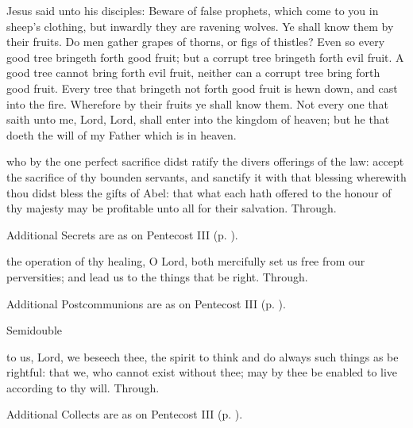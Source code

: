  Jesus said unto his disciples: Beware of false prophets, which come to you in sheep's clothing, but inwardly they are ravening wolves. Ye shall know them by their fruits. Do men gather grapes of thorns, or figs of thistles? Even so every good tree bringeth forth good fruit; but a corrupt tree bringeth forth evil fruit. A good tree cannot bring forth evil fruit, neither can a corrupt tree bring forth good fruit. Every tree that bringeth not forth good fruit is hewn down, and cast into the fire. Wherefore by their fruits ye shall know them. Not every one that saith unto me, Lord, Lord, shall enter into the kingdom of heaven; but he that doeth the will of my Father which is in heaven.

\secret
{} who by the one perfect sacrifice didst ratify the divers offerings of the law: accept the sacrifice of thy bounden servants, and sanctify it with that blessing wherewith thou didst bless the gifts of Abel: that what each hath offered to the honour of thy majesty may be profitable unto all for their salvation. Through.
\begin{rubric}
    Additional Secrets are as on Pentecost III (p. \pageref{PentecostIII}).
\end{rubric}

\postcommunion
{} the operation of thy healing, O Lord, both mercifully set us free from our perversities; and lead us to the things that be right. Through.
\begin{rubric}
    Additional Postcommunions are as on Pentecost III (p. \pageref{PentecostIII}).
\end{rubric}

\begin{inhead}
    {Semidouble}
\end{inhead}

\collect
{} to us, Lord, we beseech thee, the spirit to think and do always such things as be rightful: that we, who cannot exist without thee; may by thee be enabled to live according to thy will. Through.
\begin{rubric}
    Additional Collects are as on Pentecost III (p. \pageref{PentecostIII}).
\end{rubric}

